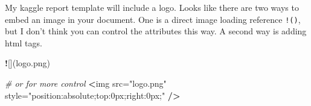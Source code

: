 \documentclass[
]{book}
\newenvironment{Shaded}{\begin{snugshade}}{\end{snugshade}}
\newcommand{\CommentTok}[1]{\textcolor[rgb]{0.56,0.35,0.01}{\textit{#1}}}
\newcommand{\ErrorTok}[1]{\textcolor[rgb]{0.64,0.00,0.00}{\textbf{#1}}}
\newcommand{\NormalTok}[1]{#1}
\newcommand{\OperatorTok}[1]{\textcolor[rgb]{0.81,0.36,0.00}{\textbf{#1}}}
\newcommand{\StringTok}[1]{\textcolor[rgb]{0.31,0.60,0.02}{#1}}
\begin{document}
My kaggle report template will include a logo. Looks like there are two ways to embed an image in your document. One is a direct image loading reference \texttt{!()}, but I don't think you can control the attributes this way. A second way is adding html tags.

\begin{Shaded}
\begin{Highlighting}[]
\OperatorTok{!}\NormalTok{[](logo.png)}

\CommentTok{# or for more control}
\OperatorTok{<}\NormalTok{img src=}\StringTok{"logo.png"}\NormalTok{ style=}\StringTok{"position:absolute;top:0px;right:0px;"} \OperatorTok{/}\ErrorTok{>}
\end{Highlighting}
\end{Shaded}

  
\end{document}
